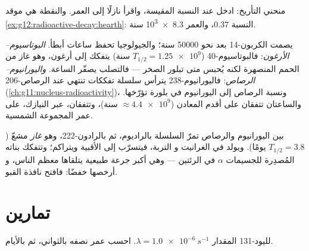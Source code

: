 \begin{omfigure}

{\small منحني التأريخ: ادخل عند النسبة المقيسة، واقرأ نازلًا إلى
العمر. والنقطة هي موقد \cref{ex:g12:radioactive-decay:hearth}:
النسبة $0.37$، والعمر \num{8.3e3} سنة.}
\end{omfigure}

\begin{example}\label{ex:g12:radioactive-decay:rocks}
يصمت الكربون-14 بعد نحو \num{50000} سنة؛ والجيولوجيا تحفظ ساعات
أبطأ. \emph{البوتاسيوم--الأرغون}: فالبوتاسيوم-40 ($T_{1/2} = \num{1.25e9}$
سنة) يتفكك إلى أرغون، وهو غاز  من الحمم المنصهرة لكنه يُحبس متى
تبلور الصخر --- فالتصلب يصفّر الساعة. \emph{واليورانيوم--الرصاص}:
فاليورانيوم-238 يترأس سلسلة تفككات تنتهي عند الرصاص-206 
(\cref{ch:g11:nucleus-radioactivity})، ونسبة الرصاص إلى اليورانيوم في
بلورة تؤرّخها. والساعتان تتفقان على أقدم المعادن
($\approx \num{4.4e9}$ سنة)، وتتفقان، عبر النيازك، على عمر المجموعة
الشمسية.
\end{example}

\begin{remark}\label{rem:g12:radioactive-decay:radon}
بين اليورانيوم والرصاص تمرّ السلسلة بالراديوم، ثم بالرادون-222،
وهو \emph{غاز} مشعّ ($T_{1/2} = 3.8$ يومًا). ويولد في الغرانيت و
التربة، فيتسرّب إلى الأقبية ويتراكم؛ وتتفكك بناته المُصدِرة
للجسيمات $\alpha$ في الرئتين --- وهي أكبر جرعة طبيعية يتلقاها معظم الناس، و
أرخصها خفضًا: فافتح نافذة القبو.
\end{remark}

\section{تمارين}

\begin{exercise}[$\star$]\label{exo:g12:radioactive-decay:1}
لليود-131 المقدار $\lambda = \qty{1.0e-6}{s^{-1}}$. احسب عمر نصفه بالثواني،
ثم بالأيام.
\end{exercise}


